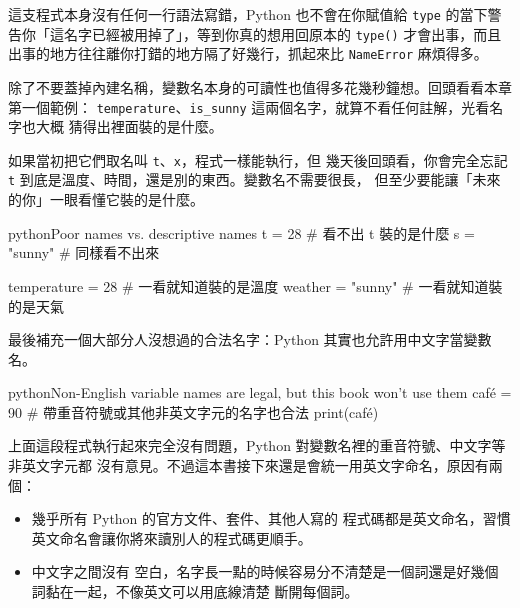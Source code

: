 這支程式本身沒有任何一行語法寫錯，Python 也不會在你賦值給
\texttt{type} 的當下警告你「這名字已經被用掉了」，等到你真的想用回原本的 \texttt{type()}
才會出事，而且出事的地方往往離你打錯的地方隔了好幾行，抓起來比 \texttt{NameError}
麻煩得多。


除了不要蓋掉內建名稱，變數名本身的可讀性也值得多花幾秒鐘想。回頭看看本章第一個範例：
\texttt{temperature}、\texttt{is\_sunny} 這兩個名字，就算不看任何註解，光看名字也大概
猜得出裡面裝的是什麼。

如果當初把它們取名叫 \texttt{t}、\texttt{x}，程式一樣能執行，但
幾天後回頭看，你會完全忘記 \texttt{t} 到底是溫度、時間，還是別的東西。變數名不需要很長，
但至少要能讓「未來的你」一眼看懂它裝的是什麼。

\begin{code}{python}{Poor names vs. descriptive names}
t = 28          # 看不出 t 裝的是什麼
s = "sunny"       # 同樣看不出來

temperature = 28       # 一看就知道裝的是溫度
weather = "sunny"        # 一看就知道裝的是天氣
\end{code}


最後補充一個大部分人沒想過的合法名字：Python 其實也允許用中文字當變數名。

\begin{code}{python}{Non-English variable names are legal, but this book won't use them}
café = 90  # 帶重音符號或其他非英文字元的名字也合法
print(café)
\end{code}

上面這段程式執行起來完全沒有問題，Python 對變數名裡的重音符號、中文字等非英文字元都
沒有意見。不過這本書接下來還是會統一用英文字命名，原因有兩個：

\begin{itemize}
\item 幾乎所有 Python 的官方文件、套件、其他人寫的
程式碼都是英文命名，習慣英文命名會讓你將來讀別人的程式碼更順手。
\item 中文字之間沒有
空白，名字長一點的時候容易分不清楚是一個詞還是好幾個詞黏在一起，不像英文可以用底線清楚
斷開每個詞。
\end{itemize}

